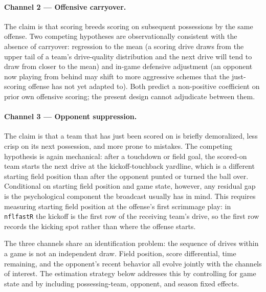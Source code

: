 \documentclass[11pt]{article}
\begin{document}
\paragraph{Channel 2 --- Offensive carryover.} The claim is that scoring
breeds scoring on subsequent possessions by the same offense. Two competing
hypotheses are observationally consistent with the absence of carryover:
regression to the mean (a scoring drive draws from the upper tail of a team's
drive-quality distribution and the next drive will tend to draw from closer
to the mean) and in-game defensive adjustment (an opponent now playing from
behind may shift to more aggressive schemes that the just-scoring offense has
not yet adapted to). Both predict a non-positive coefficient on prior own
offensive scoring; the present design cannot adjudicate between them.

\paragraph{Channel 3 --- Opponent suppression.} The claim is that a team that
has just been scored on is briefly demoralized, less crisp on its next
possession, and more prone to mistakes. The competing hypothesis is again
mechanical: after a touchdown or field goal, the scored-on team starts the
next drive at the kickoff-touchback yardline, which is a different starting
field position than after the opponent punted or turned the ball over.
Conditional on starting field position and game state, however, any residual
gap is the psychological component the broadcast usually has in mind.
This requires measuring starting field position at the offense's first
scrimmage play: in \texttt{nflfastR} the kickoff is the first row of the
receiving team's drive, so the first row records the kicking spot rather
than where the offense starts.

The three channels share an identification problem: the sequence of drives
within a game is not an independent draw. Field position, score differential,
time remaining, and the opponent's recent behavior all evolve jointly with
the channels of interest. The estimation strategy below addresses this by
controlling for game state and by including possessing-team, opponent, and
season fixed effects.
\end{document}
